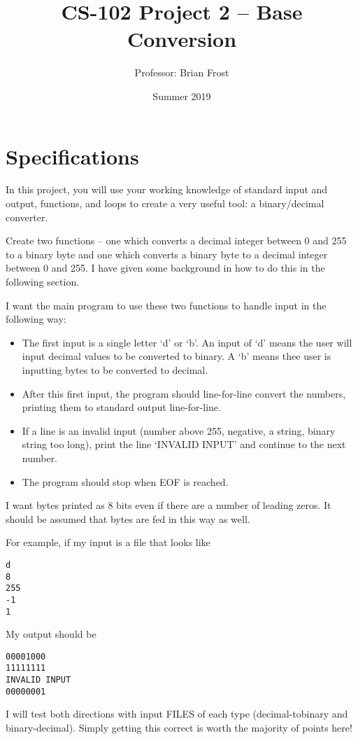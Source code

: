 \documentclass{article}
\title{CS-102 Project 2 -- Base Conversion}
\author{Professor: Brian Frost}
\date{Summer 2019}
\begin{document}
\maketitle

\section*{Specifications}
In this project, you will use your working knowledge of standard input and output, functions, and loops to create a very useful tool: a binary/decimal converter. 

Create two functions -- one which converts a decimal integer between 0 and 255 to a binary byte and one which converts a binary byte to a decimal integer between 0 and 255. I have given some background in how to do this in the following section.

I want the main program to use these two functions to handle input in the following way:
\begin{itemize}
	\item The first input is a single letter `d' or `b'. An input of `d' means the user will input decimal values to be converted to binary. A `b' means thee user is inputting bytes to be converted to decimal.
	\item After this first input, the program should line-for-line convert the numbers, printing them to standard output line-for-line.
	\item If a line is an invalid input (number above 255, negative, a string, binary string too long), print the line `INVALID INPUT' and continue to the next number.
	\item The program should stop when EOF is reached.
\end{itemize} 

I want bytes printed as 8 bits even if there are a number of leading zeros. It should be assumed that bytes are fed in this way as well.

For example, if my input is a file that looks like
\begin{verbatim}
d
8
255
-1
1
\end{verbatim}
My output should be
\begin{verbatim}
00001000
11111111
INVALID INPUT
00000001
\end{verbatim}

I will test both directions with input FILES of each type (decimal-tobinary and binary-decimal). Simply getting this correct is worth the majority of points here!
\end{document}
